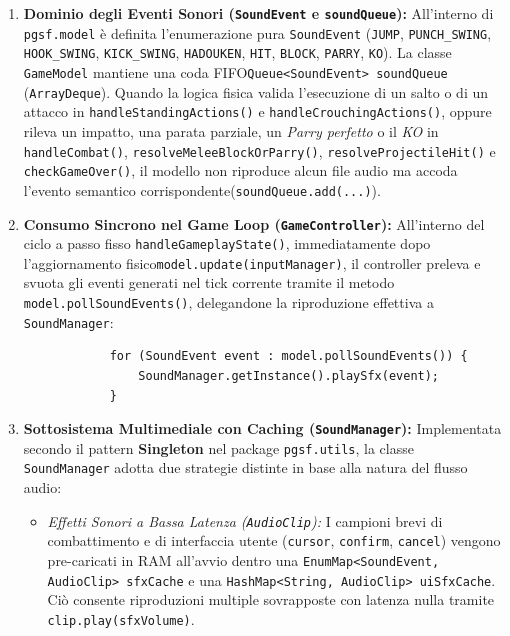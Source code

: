\documentclass[11pt, a4paper]{article}
\begin{document}
	\begin{enumerate}
		\item \textbf{Dominio degli Eventi Sonori (\texttt{SoundEvent} e \texttt{soundQueue}):} All'interno di \texttt{pgsf.model} è definita l'enumerazione pura \texttt{SoundEvent} (\texttt{JUMP}, \texttt{PUNCH\_SWING}, \texttt{HOOK\_SWING}, \texttt{KICK\_SWING}, \texttt{HADOUKEN}, \texttt{HIT}, \texttt{BLOCK}, \texttt{PARRY}, \texttt{KO}). La classe \texttt{GameModel} mantiene una coda FIFO\newline\texttt{Queue<SoundEvent> soundQueue} (\texttt{ArrayDeque}). Quando la logica fisica valida l'esecuzione di un salto o di un attacco in \texttt{handleStandingActions()} e \texttt{handleCrouchingActions()}, oppure rileva un impatto, una parata parziale, un \emph{Parry perfetto} o il \emph{KO} in \texttt{handleCombat()}, \texttt{resolveMeleeBlockOrParry()}, \texttt{resolveProjectileHit()} e \texttt{checkGameOver()}, il modello non riproduce alcun file audio ma accoda l'evento semantico corrispondente\newline(\texttt{soundQueue.add(...)}).
		\item \textbf{Consumo Sincrono nel Game Loop (\texttt{GameController}):} All'interno del ciclo a passo fisso \texttt{handleGameplayState()}, immediatamente dopo l'aggiornamento fisico\newline\texttt{model.update(inputManager)}, il controller preleva e svuota gli eventi generati nel tick corrente tramite il metodo \texttt{model.pollSoundEvents()}, delegandone la riproduzione effettiva a \texttt{SoundManager}:
		\begin{verbatim}
			for (SoundEvent event : model.pollSoundEvents()) {
				SoundManager.getInstance().playSfx(event);
			}
		\end{verbatim}
		\item \textbf{Sottosistema Multimediale con Caching (\texttt{SoundManager}):} Implementata secondo il pattern \textbf{Singleton} nel package \texttt{pgsf.utils}, la classe \texttt{SoundManager} adotta due strategie distinte in base alla natura del flusso audio:
		\begin{itemize}
			\item \emph{Effetti Sonori a Bassa Latenza (\texttt{AudioClip}):} I campioni brevi di combattimento e di interfaccia utente (\texttt{cursor}, \texttt{confirm}, \texttt{cancel}) vengono pre-caricati in RAM all'avvio dentro una \texttt{EnumMap<SoundEvent, AudioClip> sfxCache} e una \texttt{HashMap<String, AudioClip> uiSfxCache}. Ciò consente riproduzioni multiple sovrapposte con latenza nulla tramite \texttt{clip.play(sfxVolume)}.

\end{itemize}
\end{enumerate}
\end{document}
